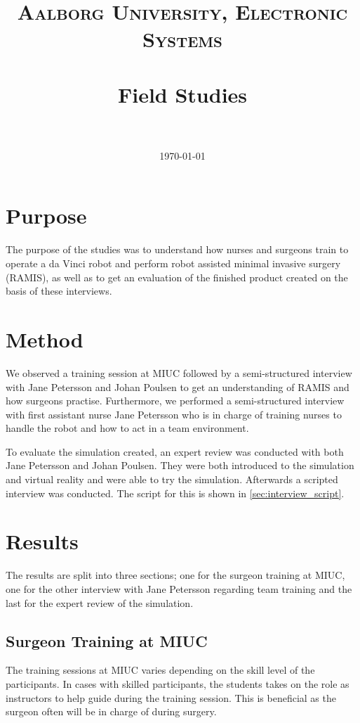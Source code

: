 \documentclass[paper=a4, fontsize=11pt]{scrartcl} %
\title{	
\normalfont \normalsize 
\textsc{Aalborg University, Electronic Systems} \\ [25pt] %
\horrule{0.5pt} \\[0.4cm] %
\huge Field Studies \\ %
\horrule{2pt} \\[0.5cm] %
}
\date{\normalsize\today} %
\numberwithin{equation}{section} %
\numberwithin{figure}{section} %
\numberwithin{table}{section} %
\begin{document}
\maketitle %


\section{Purpose}
The purpose of the studies was to understand how nurses and surgeons train to operate a da Vinci robot and perform robot assisted minimal invasive surgery (RAMIS), as well as to get an evaluation of the finished product created on the basis of these interviews. 

\section{Method}
We observed a training session at MIUC followed by a semi-structured interview with Jane Petersson and Johan Poulsen to get an understanding of RAMIS and how surgeons practise. Furthermore, we performed a semi-structured interview with first assistant nurse Jane Petersson who is in charge of training nurses to handle the robot and how to act in a team environment.

To evaluate the simulation created, an expert review was conducted with both Jane Petersson and Johan Poulsen.  They were both introduced to the simulation and virtual reality and were able to try the simulation. Afterwards a scripted interview was conducted. The script for this is shown in \autoref{sec:interview_script}.

\section{Results}
The results are split into three sections; one for the surgeon training at MIUC, one for the other interview with Jane Petersson regarding team training and the last for the expert review of the simulation.

\subsection{Surgeon Training at MIUC}
The training sessions at MIUC varies depending on the skill level of the participants. In cases with skilled participants, the students takes on the role as instructors to help guide during the training session. This is beneficial as the surgeon often will be in charge of during surgery.
\end{document}
